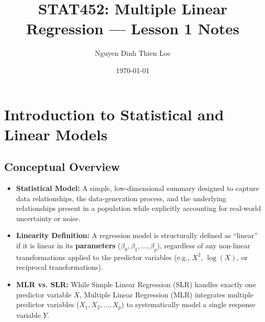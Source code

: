 \documentclass{article}
\title{STAT452: Multiple Linear Regression --- Lesson 1 Notes}
\author{Nguyen Dinh Thien Loc}
\date{\today}
\begin{document}
\maketitle

\section{Introduction to Statistical and Linear Models}

\subsection{Conceptual Overview}
\begin{itemize}
    \item \textbf{Statistical Model:} A simple, low-dimensional summary designed to capture data relationships, the data-generation process, and the underlying relationships present in a population while explicitly accounting for real-world uncertainty or noise.
    \item \textbf{Linearity Definition:} A regression model is structurally defined as ``linear'' if it is linear in its \textbf{parameters} ($\beta_0, \beta_1, \dots, \beta_p$), regardless of any non-linear transformations applied to the predictor variables (e.g., $X^2$, $\log(X)$, or reciprocal transformations).
    \item \textbf{MLR vs. SLR:} While Simple Linear Regression (SLR) handles exactly one predictor variable $X$, Multiple Linear Regression (MLR) integrates multiple predictor variables ($X_1, X_2, \dots, X_p$) to systematically model a single response variable $Y$.
\end{itemize}
\end{document}
